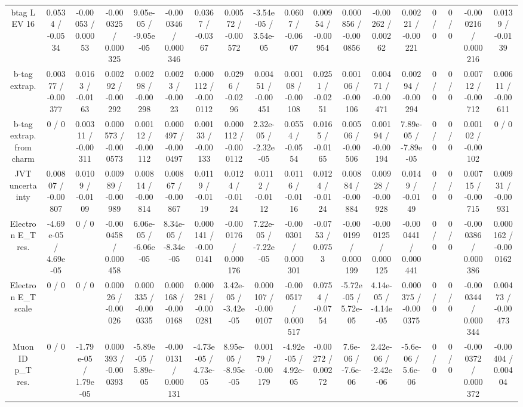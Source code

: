 \documentclass[10pt]{article}
\begin{document}
\begin{table}[htbp]
\begin{center}
\begin{tabular}{|c|c|c|c|c|c|c|c|c|c|c|c|c|c|c|c|c|c|}
  btag L EV 16 & 0.0534 / -0.0534 & -0.00053 / 0.00053 & -0.000325 / 0.000325 & 9.05e-05 / -9.05e-05 & -0.000346 / 0.000346 & 0.0367 / -0.0367 & 0.00572 / -0.00572 & -3.54e-05 / 3.54e-05 & 0.0607 / -0.0607 & 0.00954 / -0.00954 & 0.000856 / -0.000856 & -0.00262 / 0.00262 & 0.00221 / -0.00221 & 0 / 0 & 0 / 0 & -0.000216 / 0.000216 & 0.0139 / -0.0139 \\ 
  b-tag extrap. & 0.00377 / -0.00377 & 0.0163 / -0.0163 & 0.00292 / -0.00292 & 0.00298 / -0.00298 & 0.0023 / -0.0023 & 0.000112 / -0.000112 & 0.0296 / -0.0296 & 0.00451 / -0.00451 & 0.00108 / -0.00108 & 0.0251 / -0.0251 & 0.00106 / -0.00106 & 0.00471 / -0.00471 & 0.00294 / -0.00294 & 0 / 0 & 0 / 0 & 0.00712 / -0.00712 & 0.00611 / -0.00611 \\ 
  b-tag extrap. from charm & 0 / 0 & 0.00311 / -0.00311 & 0.000573 / -0.000573 & 0.00112 / -0.00112 & 0.000497 / -0.000497 & 0.00133 / -0.00133 & 0.000112 / -0.000112 & 2.32e-05 / -2.32e-05 & 0.0554 / -0.0554 & 0.0165 / -0.0165 & 0.00506 / -0.00506 & 0.00194 / -0.00194 & 7.89e-05 / -7.89e-05 & 0 / 0 & 0 / 0 & 0.00102 / -0.00102 & 0 / 0 \\ 
  JVT uncertainty & 0.00807 / -0.00807 & 0.0109 / -0.0109 & 0.00989 / -0.00989 & 0.00814 / -0.00814 & 0.00867 / -0.00867 & 0.0119 / -0.0119 & 0.0124 / -0.0124 & 0.0112 / -0.0112 & 0.0116 / -0.0116 & 0.0124 / -0.0124 & 0.00884 / -0.00884 & 0.00928 / -0.00928 & 0.0149 / -0.0149 & 0 / 0 & 0 / 0 & 0.00715 / -0.00715 & 0.00931 / -0.00931 \\ 
  Electron E_{T} res. & -4.69e-05 / 4.69e-05 & 0 / 0 & -0.000458 / 0.000458 & 6.06e-05 / -6.06e-05 & 8.34e-05 / -8.34e-05 & 0.000141 / -0.000141 & -0.000176 / 0.000176 & 7.22e-05 / -7.22e-05 & -0.000301 / 0.000301 & -0.0753 / 0.0753 & -0.000199 / 0.000199 & -0.000125 / 0.000125 & -0.000441 / 0.000441 & 0 / 0 & 0 / 0 & -0.000386 / 0.000386 & 0.000162 / -0.000162 \\ 
  Electron E_{T} scale & 0 / 0 & 0 / 0 & 0.00026 / -0.00026 & 0.000335 / -0.000335 & 0.000168 / -0.000168 & 0.000281 / -0.000281 & 3.42e-05 / -3.42e-05 & 0.000107 / -0.000107 & -0.000517 / 0.000517 & 0.0754 / -0.0754 & -5.72e-05 / 5.72e-05 & 4.14e-05 / -4.14e-05 & 0.000375 / -0.000375 & 0 / 0 & 0 / 0 & -0.000344 / 0.000344 & 0.00473 / -0.00473 \\ 
  Muon ID p_{T} res. & 0 / 0 & -1.79e-05 / 1.79e-05 & 0.000393 / -0.000393 & -5.89e-05 / 5.89e-05 & -0.000131 / 0.000131 & -4.73e-05 / 4.73e-05 & 8.95e-05 / -8.95e-05 & 0.00179 / -0.00179 & -4.92e-05 / 4.92e-05 & -0.00272 / 0.00272 & 7.6e-06 / -7.6e-06 & 2.42e-06 / -2.42e-06 & -5.6e-06 / 5.6e-06 & 0 / 0 & 0 / 0 & -0.000372 / 0.000372 & -0.00404 / 0.00404 \\ 

\end{tabular}
\end{center}
\end{table}
\end{document}
